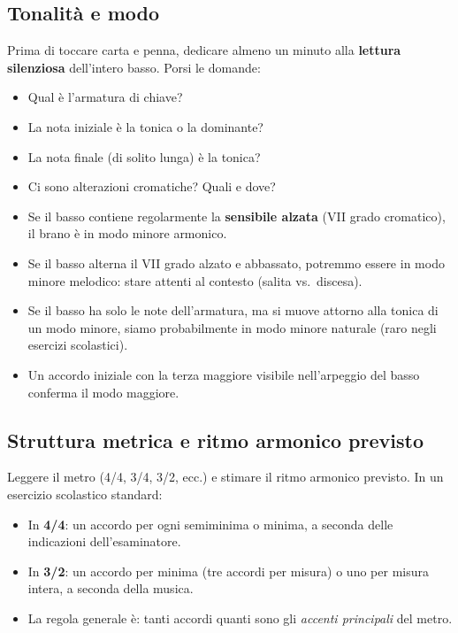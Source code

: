 \subsection{Tonalità e modo}

Prima di toccare carta e penna, dedicare almeno un minuto alla \textbf{lettura silenziosa} dell'intero basso. Porsi le domande:
\begin{itemize}
	\item Qual è l'armatura di chiave?
	\item La nota iniziale è la tonica o la dominante?
	\item La nota finale (di solito lunga) è la tonica?
	\item Ci sono alterazioni cromatiche? Quali e dove?
\end{itemize}

\begin{regola}
	\label{reg:lettura_diagnostica}
	\begin{itemize}
		\item Se il basso contiene regolarmente la \textbf{sensibile alzata} (VII grado cromatico), il brano è in modo minore armonico.
		\item Se il basso alterna il VII grado alzato e abbassato, potremmo essere in modo minore melodico: stare attenti al contesto (salita vs.\ discesa).
		\item Se il basso ha solo le note dell'armatura, ma si muove attorno alla tonica di un modo minore, siamo probabilmente in modo minore naturale (raro negli esercizi scolastici).
		\item Un accordo iniziale con la terza maggiore visibile nell'arpeggio del basso conferma il modo maggiore.
	\end{itemize}
\end{regola}

\subsection{Struttura metrica e ritmo armonico previsto}

Leggere il metro (4/4, 3/4, 3/2, ecc.) e stimare il ritmo armonico previsto. In un esercizio scolastico standard:
\begin{itemize}
	\item In \textbf{4/4}: un accordo per ogni semiminima o minima, a seconda delle indicazioni dell'esaminatore.
	\item In \textbf{3/2}: un accordo per minima (tre accordi per misura) o uno per misura intera, a seconda della musica.
	\item La regola generale è: tanti accordi quanti sono gli \textit{accenti principali} del metro.
\end{itemize}


